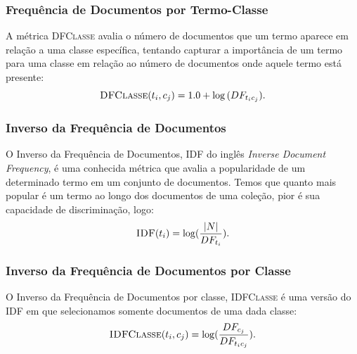 \subsubsection{Frequência de Documentos por Termo-Classe}%
\label{subsubsection::sumdf}

A métrica \textsc{DFClasse} avalia o número de documentos que um termo aparece em relação a uma classe específica, tentando capturar a importância de um termo para uma classe em relação ao número de documentos onde aquele termo está presente:
\begin{equation}\label{eqn::sumtf}
 \textsc{DFClasse}(t_i,c_j) = 1.0 + \log{ ( DF_{t_ic_j} ) }.
\end{equation}


\subsubsection{Inverso da Frequência de Documentos}%
\label{subsubsection::idf}

O Inverso da Frequência de Documentos, \textsc{IDF} do inglês \textit{Inverse Document Frequency}, é uma conhecida métrica que avalia a popularidade de um determinado termo em um conjunto de documentos. Temos que quanto mais popular é um termo ao longo dos documentos de uma coleção, pior é sua capacidade de discriminação, logo:
\begin{equation}\label{eqn::tficf}
 \textsc{IDF}(t_i) = \log( \frac{|N|} {DF_{t_i}} ).
\end{equation}


\subsubsection{Inverso da Frequência de Documentos por Classe}%
\label{subsubsection::idf}

O Inverso da Frequência de Documentos por classe, \textsc{IDFClasse} é uma versão do \textsc{IDF} em que selecionamos somente documentos de uma dada classe:
\begin{equation}\label{eqn::tficf}
 \textsc{IDFClasse}(t_i,c_j) = \log( \frac{DF_{c_j}} {DF_{t_ic_j} }).
\end{equation}


